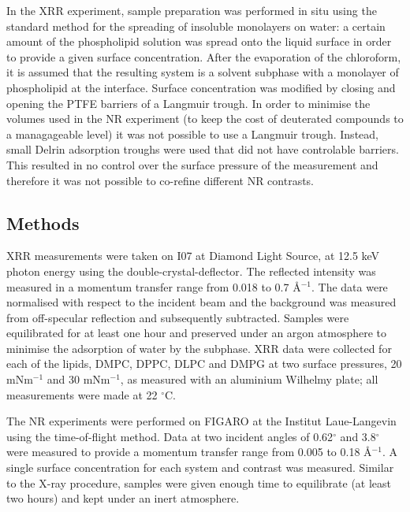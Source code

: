 \documentclass[twoside,twocolumn,9pt]{article}
\begin{document}
In the XRR experiment, sample preparation was performed in situ using the standard method for the spreading of insoluble monolayers on water: a certain amount of the phospholipid solution was spread onto the liquid surface in order to provide a given surface concentration. After the evaporation of the chloroform, it is assumed that the resulting system is a solvent subphase with a monolayer of phospholipid at the interface. Surface concentration was modified by closing and opening the PTFE barriers of a Langmuir trough. In order to minimise the volumes used in the NR experiment (to keep the cost of deuterated compounds to a managageable level) it was not possible to use a Langmuir trough. Instead, small Delrin adsorption troughs were used that did not have controlable barriers. This resulted in no control over the surface pressure of the measurement and therefore it was not possible to co-refine different NR contrasts. 

\subsection{Methods}
XRR measurements were taken on I07 at Diamond Light Source, at 12.5 keV photon energy using the double-crystal-deflector.\cite{Arnold2012} The reflected intensity was measured in a momentum transfer range from 0.018 to 0.7 \AA$^{-1}$. The data were normalised with respect to the incident beam and the background was measured from off-specular reflection and subsequently subtracted. Samples were equilibrated for at least one hour and preserved under an argon atmosphere to minimise the adsorption of water by the subphase. XRR data were collected for each of the lipids, DMPC, DPPC, DLPC and DMPG at two surface pressures, 20 mNm$^{-1}$ and 30 mNm$^{-1}$, as measured with an aluminium Wilhelmy plate; all measurements were made at 22 $^\circ$C. 

The NR experiments were performed on FIGARO at the Institut Laue-Langevin using the time-of-flight method.\cite{Campbell2011} Data at two incident angles of 0.62$^\circ$ and 3.8$^\circ$ were measured to provide a momentum transfer range from 0.005 to 0.18 \AA$^{-1}$. A single surface concentration for each system and contrast was measured. Similar to the X-ray procedure, samples were given enough time to equilibrate (at least two hours) and kept under an inert atmosphere.
\end{document}
